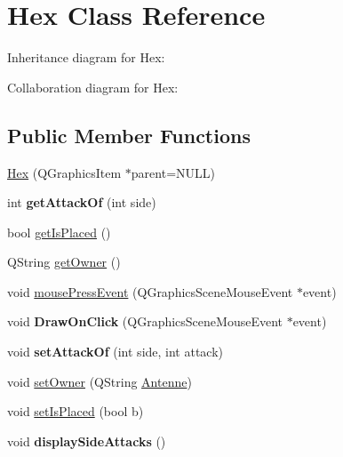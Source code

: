 \hypertarget{class_hex}{}\section{Hex Class Reference}
\label{class_hex}


Inheritance diagram for Hex\+:


Collaboration diagram for Hex\+:
\subsection*{Public Member Functions}
\begin{DoxyCompactItemize}
\item 
\mbox{\hyperlink{class_hex_aa2e838d9afb36b5f7d0000ec523ed777}{Hex}} (Q\+Graphics\+Item $\ast$parent=N\+U\+LL)
\item 
\mbox{\label{class_hex_a42e1019e8cbd2339a52021b4d48fac83}} 
int {\bfseries get\+Attack\+Of} (int side)
\item 
bool \mbox{\hyperlink{class_hex_ab3088c379066efac7e39fd24cb7a5f3d}{get\+Is\+Placed}} ()
\item 
Q\+String \mbox{\hyperlink{class_hex_a5e3c6d3cba025b51129ac90500d80a8f}{get\+Owner}} ()
\item 
void \mbox{\hyperlink{class_hex_a56c086c58855a7996e83d88fd5e7916b}{mouse\+Press\+Event}} (Q\+Graphics\+Scene\+Mouse\+Event $\ast$event)
\item 
\mbox{\label{class_hex_ac6ecad537622e5c776437d7194dd1dc8}} 
void {\bfseries Draw\+On\+Click} (Q\+Graphics\+Scene\+Mouse\+Event $\ast$event)
\item 
\mbox{\label{class_hex_a4d6282b0a005876cc0fa16c5f27a9989}} 
void {\bfseries set\+Attack\+Of} (int side, int attack)
\item 
void \mbox{\hyperlink{class_hex_ace642e24e5b74836e6c89ba4bbcf5b11}{set\+Owner}} (Q\+String \mbox{\hyperlink{class_antenne}{Antenne}})
\item 
void \mbox{\hyperlink{class_hex_ad17b48a7e4294a7dc6a79f4661275a7f}{set\+Is\+Placed}} (bool b)
\item 
\mbox{\label{class_hex_ab569abea4dea6e633ee2213ddb2710c2}} 
void {\bfseries display\+Side\+Attacks} ()
\item 
\mbox{\label{class_hex_a659e5583f7d88a0abfd4cda4bc60686a}} 

\end{DoxyCompactItemize}
